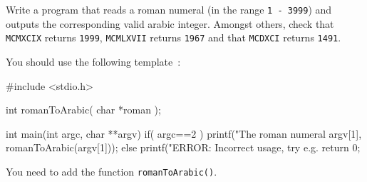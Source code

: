 \begin{exercise}
Write a program that reads a roman numeral (in the range
\verb^1 - 3999^) and outputs the corresponding valid arabic integer. Amongst
others, check that \verb^MCMXCIX^ returns \verb^1999^,
\verb^MCMLXVII^ returns \verb^1967^ and that \verb^MCDXCI^ returns
\verb^1491^.

You should use the following template~:

\begin{codesnippet}
#include <stdio.h>

int romanToArabic( char *roman );

int main(int argc, char **argv)
{
   if( argc==2 ){
       printf("The roman numeral %
       argv[1], romanToArabic(argv[1]));
   }else{
       printf("ERROR: Incorrect usage, try e.g. %
   }
   return 0;
}
\end{codesnippet}

You need to add the function \verb^romanToArabic()^.
\end{exercise}
